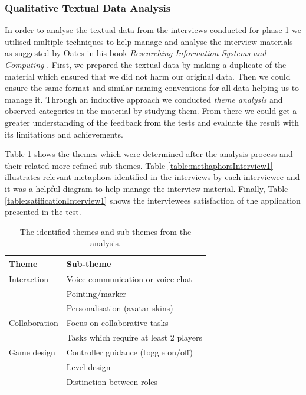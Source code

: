\subsubsection{Qualitative Textual Data Analysis}
In order to analyse the textual data from the interviews conducted for phase 1 we utilised multiple techniques to help manage and analyse the interview materials as suggested by Oates in his book \textit{Researching Information Systems and Computing } \cite{oates2005researching}. First, we prepared the textual data by making a duplicate of the material which ensured that we did not harm our original data. Then we could ensure the same format and similar naming conventions for all data helping us to manage it. Through an inductive approach \cite{oates2005researching} we conducted \textit{theme analysis} and observed categories in the material by studying them. From there we could get a greater understanding of the feedback from the tests and evaluate the result with its limitations and achievements.

Table \ref{table:themesInterview1} shows the themes which were determined after the analysis process and their related more refined sub-themes.  Table \ref{table:methaphorsInterview1} illustrates relevant metaphors identified in the interviews by each interviewee and it was a helpful diagram to help manage the interview material. Finally, Table \ref{table:satificationInterview1} shows the interviewees satisfaction of the application presented in the test.     

\begin{table}[!ht]
      \centering
        \begin{tabular}{ll}
        \toprule
        Theme & Sub-theme \\
        \midrule
        Interaction & Voice communication or voice chat\\
        & Pointing/marker \\\vspace{0.2cm}
        & Personalisation (avatar skins) \\
        Collaboration & Focus on collaborative tasks \\\vspace{0.2cm}
        & Tasks which require at least 2 players \\
        Game design & Controller guidance (toggle on/off)\\
        & Level design\\
        & Distinction between roles\\
        \bottomrule
        \end{tabular}
        \caption{The identified themes and sub-themes from the analysis.}
        \label{table:themesInterview1}
\end{table}




